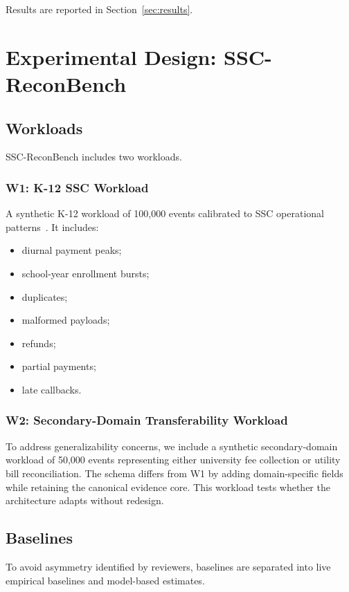 \documentclass[journal]{IEEEtran}
\begin{document}
Results are reported in Section~\ref{sec:results}.

\section{Experimental Design: SSC-ReconBench}
\label{sec:exp}

\subsection{Workloads}
SSC-ReconBench includes two workloads.

\subsubsection{W1: K-12 SSC Workload}
A synthetic K-12 workload of 100{,}000 events calibrated to SSC operational patterns~\cite{le2026ssc}. It includes:
\begin{itemize}[nosep,leftmargin=2em]
    \item diurnal payment peaks;
    \item school-year enrollment bursts;
    \item duplicates;
    \item malformed payloads;
    \item refunds;
    \item partial payments;
    \item late callbacks.
\end{itemize}

\subsubsection{W2: Secondary-Domain Transferability Workload}
To address generalizability concerns, we include a synthetic secondary-domain workload of 50{,}000 events representing either university fee collection or utility bill reconciliation. The schema differs from W1 by adding domain-specific fields while retaining the canonical evidence core. This workload tests whether the architecture adapts without redesign.

\subsection{Baselines}
To avoid asymmetry identified by reviewers, baselines are separated into live empirical baselines and model-based estimates.
\end{document}
